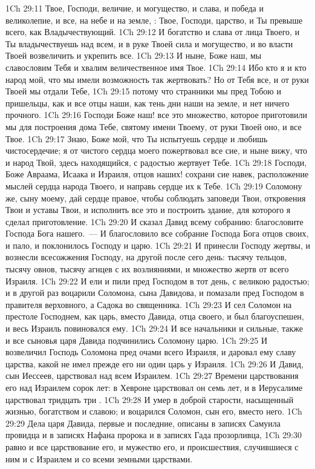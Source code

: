 \vs 1Ch 29:11 Твое, Господи, величие, и могущество, и слава, и победа и великолепие, и все,  на небе и на земле, : Твое, Господи, царство, и Ты превыше всего, как Владычествующий.
\vs 1Ch 29:12 И богатство и слава от лица Твоего, и Ты владычествуешь над всем, и в руке Твоей сила и могущество, и во власти Твоей возвеличить и укрепить все.
\vs 1Ch 29:13 И ныне, Боже наш, мы славословим Тебя и хвалим величественное имя Твое.
\vs 1Ch 29:14 Ибо кто я и кто народ мой, что мы имели возможность так жертвовать? Но от Тебя все, и от руки Твоей  мы отдали Тебе,
\vs 1Ch 29:15 потому что странники мы пред Тобою и пришельцы, как и все отцы наши, как тень дни наши на земле, и нет ничего прочного.
\vs 1Ch 29:16 Господи Боже наш! все это множество, которое приготовили мы для построения дома Тебе, святому имени Твоему, от руки Твоей оно, и все Твое.
\vs 1Ch 29:17 Знаю, Боже мой, что Ты испытуешь сердце и любишь чистосердечие; я от чистого сердца моего пожертвовал все сие, и ныне вижу, что и народ Твой, здесь находящийся, с радостью жертвует Тебе.
\vs 1Ch 29:18 Господи, Боже Авраама, Исаака и Израиля, отцов наших! сохрани сие навек,  расположение мыслей сердца народа Твоего, и направь сердце их к Тебе.
\vs 1Ch 29:19 Соломону же, сыну моему, дай сердце правое, чтобы соблюдать заповеди Твои, откровения Твои и уставы Твои, и исполнить все это и построить здание, для которого я сделал приготовление.
\rsbpar\vs 1Ch 29:20 И сказал Давид всему собранию: благословите Господа Бога нашего.~--- И благословило все собрание Господа Бога отцов своих, и пало, и поклонилось Господу и царю.
\vs 1Ch 29:21 И принесли Господу жертвы, и вознесли всесожжения Господу, на другой после сего день: тысячу тельцов, тысячу овнов, тысячу агнцев с их возлияниями, и множество жертв от всего Израиля.
\vs 1Ch 29:22 И ели и пили пред Господом в тот день, с великою радостью; и в другой раз воцарили Соломона, сына Давидова, и помазали пред Господом в правителя верховного, а Садока во священника.
\vs 1Ch 29:23 И сел Соломон на престоле Господнем, как царь, вместо Давида, отца своего, и был благоуспешен, и весь Израиль повиновался ему.
\vs 1Ch 29:24 И все начальники и сильные, также и все сыновья царя Давида подчинились Соломону царю.
\vs 1Ch 29:25 И возвеличил Господь Соломона пред очами всего Израиля, и даровал ему славу царства, какой не имел прежде его ни один царь у Израиля.
\rsbpar\vs 1Ch 29:26 И Давид, сын Иессеев, царствовал над всем Израилем.
\vs 1Ch 29:27 Времени царствования его над Израилем  сорок лет: в Хевроне царствовал он семь лет, и в Иерусалиме царствовал тридцать три .
\vs 1Ch 29:28 И умер в доброй старости, насыщенный жизнью, богатством и славою; и воцарился Соломон, сын его, вместо него.
\rsbpar\vs 1Ch 29:29 Дела царя Давида, первые и последние, описаны в записях Самуила провидца и в записях Нафана пророка и в записях Гада прозорливца,
\vs 1Ch 29:30 равно и все царствование его, и мужество его, и происшествия, случившиеся с ним и с Израилем и со всеми земными царствами.
